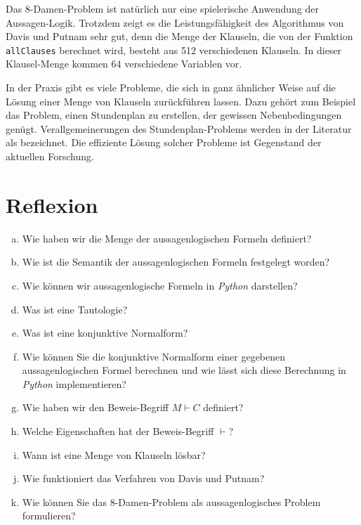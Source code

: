 Das 8-Damen-Problem ist natürlich nur eine spielerische Anwendung der Aussagen-Logik.
Trotzdem zeigt es die Leistungsfähigkeit des Algorithmus von Davis
und Putnam sehr gut, denn die Menge der Klauseln, die von der Funktion \texttt{allClauses}
berechnet wird, besteht aus 512 verschiedenen Klauseln.  In dieser Klausel-Menge kommen 64 verschiedene
Variablen vor. 

In der Praxis gibt es viele Probleme, die sich in ganz ähnlicher Weise auf die Lösung einer
Menge von Klauseln zurückführen lassen.  Dazu gehört zum Beispiel das Problem, einen
Stundenplan zu erstellen, der gewissen Nebenbedingungen genügt.  Verallgemeinerungen des
Stundenplan-Problems werden in der Literatur als  bezeichnet.
Die effiziente Lösung solcher Probleme ist Gegenstand der aktuellen Forschung.

\section{Reflexion}
\begin{enumerate}[(a)]
\item Wie haben wir die Menge der aussagenlogischen Formeln definiert?
\item Wie ist die Semantik der aussagenlogischen Formeln festgelegt worden?
\item Wie können wir aussagenlogische Formeln in \textsl{Python} darstellen?
\item Was ist eine Tautologie?
\item Was ist eine konjunktive Normalform?
\item Wie können Sie die konjunktive Normalform einer gegebenen aussagenlogischen Formel berechnen und wie lässt
      sich diese Berechnung in \textsl{Python} implementieren?
\item Wie haben wir den Beweis-Begriff $M \vdash C$ definiert?
\item Welche Eigenschaften hat der Beweis-Begriff $\vdash$?
\item Wann ist eine Menge von Klauseln lösbar?
\item Wie funktioniert das Verfahren von Davis und Putnam?
\item Wie können Sie das 8-Damen-Problem als aussagenlogisches Problem formulieren?
\end{enumerate}

%

